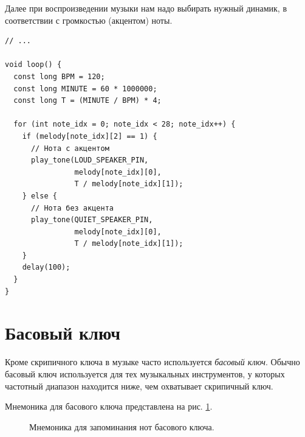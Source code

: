 \documentclass[a4paper,twoside]{book}
\begin{document}
Далее при воспроизведении музыки нам надо выбирать нужный динамик, в
соответствии с громкостью (акцентом) ноты.

\begin{verbatim}
// ...

void loop() {
  const long BPM = 120;
  const long MINUTE = 60 * 1000000;
  const long T = (MINUTE / BPM) * 4;

  for (int note_idx = 0; note_idx < 28; note_idx++) {
    if (melody[note_idx][2] == 1) {
      // Нота с акцентом
      play_tone(LOUD_SPEAKER_PIN,
                melody[note_idx][0],
                T / melody[note_idx][1]);
    } else {
      // Нота без акцента
      play_tone(QUIET_SPEAKER_PIN,
                melody[note_idx][0],
                T / melody[note_idx][1]);
    }
    delay(100);
  }
}
\end{verbatim}

\section{Басовый ключ}

Кроме скрипичного ключа в музыке часто используется \emph{басовый ключ}.  Обычно
басовый ключ используется для тех музыкальных инструментов, у которых частотный
диапазон находится ниже, чем охватывает скрипичный ключ.

Мнемоника для басового ключа представлена на
рис. \ref{fig:lilypond-music-graph-2}.

\begin{figure}[ht]
  \caption{Мнемоника для запоминания нот басового ключа.}
  \label{fig:lilypond-music-graph-2}
\end{figure}
\end{document}
